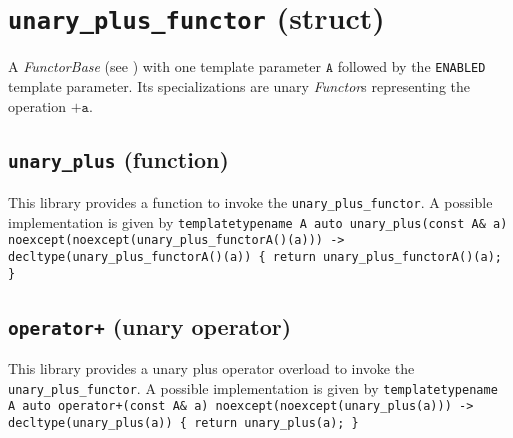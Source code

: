 \section{\texttt{unary\_plus\_functor} (struct)}
A \textit{FunctorBase} (see \cite{functors}) with one template parameter $\texttt{A}$ followed by the \texttt{ENABLED} template parameter.
Its specializations are unary \textit{Functor}s representing the operation $\texttt{+a}$.

\subsection{\texttt{unary\_plus} (function)}
This library provides a function to invoke the \texttt{unary\_plus\_functor}.
A possible implementation is given by\newline
\texttt{template\textlangle typename A\textrangle\newline
auto\newline
unary\_plus(const A\& a)\newline
noexcept(noexcept(unary\_plus\_functor\textlangle A\textrangle()(a)))\newline
-> decltype(unary\_plus\_functor\textlangle A\textrangle()(a))\newline
\{ return unary\_plus\_functor\textlangle A\textrangle()(a); \}}

\subsection{\texttt{operator+} (unary operator)}
This library provides a unary plus operator overload to invoke the \texttt{unary\_plus\_functor}.
A possible implementation is given by\newline
\texttt{template\textlangle typename A\textrangle\newline
auto\newline
operator+(const A\& a)\newline
noexcept(noexcept(unary\_plus(a)))\newline
-> decltype(unary\_plus(a))\newline
\{ return unary\_plus(a); \}}
